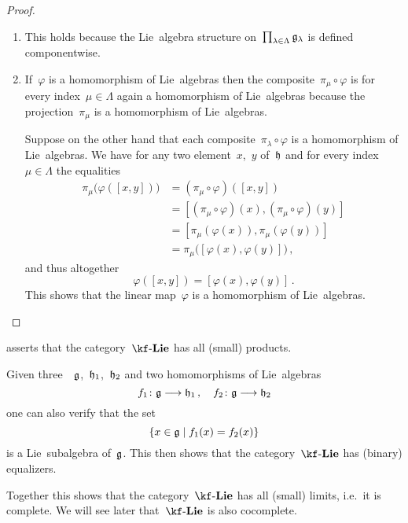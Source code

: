 \begin{proof}
  \leavevmode
  \begin{enumerate}
    \item
      This holds because the Lie~algebra structure on~$\prod_{\lambda \in \Lambda} \mathfrak{g}_{\lambda}$ is defined componentwise.
    \item
      If~$\varphi$ is a homomorphism of Lie~algebras then the composite~$\pi_\mu \circ \varphi$ is for every index~$\mu \in \Lambda$ again a homomorphism of Lie~algebras because the projection~$\pi_\mu$ is a homomorphism of Lie~algebras.

      Suppose on the other hand that each composite~$\pi_\lambda \circ \varphi$ is a homomorphism of Lie~algebras.
      We have for any two element~$x$,~$y$ of~$\mathfrak{h}$ and for every index~$\mu \in \Lambda$ the equalities
      \begin{align*}
        \pi_\mu\bigl( \varphi( [ x, y ] ) \bigr)
        &=
        (\pi_\mu \circ \varphi)( [x, y] )
        \\
        &=
        [ (\pi_\mu \circ \varphi)(x), (\pi_\mu \circ \varphi)(y) ]
        \\
        &=
        [ \pi_\mu( \varphi(x) ), \pi_\mu( \varphi(y) ) ]
        \\
        &=
        \pi_\mu\bigl( [\varphi(x), \varphi(y)] \bigr) \,,
      \end{align*}
      and thus altogether
      \[
        \varphi( [x,y] ) = [ \varphi(x), \varphi(y) ] \,.
      \]
      This shows that the linear map~$\varphi$ is a homomorphism of Lie~algebras.
    \qedhere
  \end{enumerate}
\end{proof}


\begin{remark}
   asserts that the category~$\cLie{\kf}$ has all (small) products.

  Given three~\liealgebras{$\kf$}~$\mathfrak{g}$,~$\mathfrak{h}_1$,~$\mathfrak{h}_2$ and two homomorphisms of Lie~algebras
  \[
    f_1 \colon \glie \to \hlie_1 \,,
    \quad
    f_2 \colon \glie \to \hlie_2
  \]
  one can also verify that the set
  \[
    \{
      x \in \glie
    \suchthat
      f_1(x) = f_2(x)
    \}
  \]
  is a Lie~subalgebra of~$\mathfrak{g}$.
  This then shows that the category~$\cLie{\kf}$ has (binary) equalizers.

  Together this shows that the category~$\cLie{\kf}$ has all (small) limits, i.e.\ it is complete.
  We will see later that~$\cLie{\kf}$ is also cocomplete.
\end{remark}



